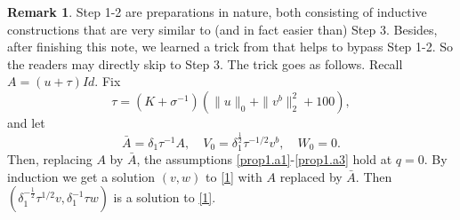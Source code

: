 \documentclass[reqno,12pt]{amsart}
\numberwithin{equation}{section}
\theoremstyle{plain}
\theoremstyle{definition}
\newtheorem{rem}[thm]{Remark}
\begin{document}
\begin{rem}\label{rem999}
    Step 1-2 are preparations in nature,  both consisting of inductive constructions that are very similar to (and in fact easier than) Step 3. Besides, after finishing this note, we learned a trick from \cite[Section 4]{cao23c1frac13} that helps to bypass Step 1-2. So the readers may directly skip to Step 3. The trick goes as follows. Recall $A=(u+\tau)Id$. Fix
    \[
    \tau = (K+\sigma^{-1})(\|u\|_0+\|v^b\|_2^2+100),
    \]
    and let
    \[
    \bar A=\delta_1\tau^{-1} A,\quad V_0 = \delta_1^{\frac{1}{2}}\tau^{-1/2} v^b,\quad W_0 = 0.
    \]
    Then, replacing $A$ by $\bar A$, the assumptions \eqref{prop1.a1}-\eqref{prop1.a3} hold at $q=0$. By induction we get a solution $(v,w)$ to \eqref{1} with $A$ replaced by $\bar A$. Then $(\delta_1^{-\frac{1}{2}}\tau^{1/2}v,\delta_1^{-1}\tau w)$ is a solution to \eqref{1}.
\end{rem}
\end{document}
